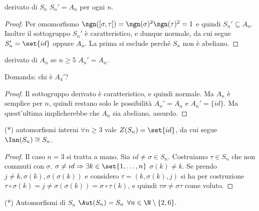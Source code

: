 \begin{proposition}{derivato di $S_n$}
    $S_n' = A_n$ per ogni $n$.    
\end{proposition}
\begin{proof}
    Per omomorfismo $\sgn([\sigma, \tau]) = \sgn(\sigma)^2\sgn(\tau)^2 = 1$ e quindi $S_n' \subseteq A_n$. \\ Inoltre il sottogruppo $S_n'$ è caratteristico, e dunque normale, da cui segue $S_n' = \set{id}$ oppure $A_n$. La prima si esclude perché $S_n$ non è abeliano. 
\end{proof}
\begin{proposition}{derivato di $A_n$}
    se $n \geq 5$ $A_n' = A_n$.
    
    Domanda: chi è $A_4'$?
\end{proposition}
\begin{proof}
    Il sottogruppo derivato è caratteristico, e quindi normale. Ma $A_n$ è semplice per $n $, quindi restano solo le possibilità $A_n' = A_n$ e $A_n' = \{ id\}$. Ma quest'ultima implicherebbe che $A_n$ sia abeliano, assurdo. 
\end{proof}
\hypertarget{InnSn}{\begin{proposition}{(*) automorfismi interni}
    $\forall n\geq3$ vale $Z(S_n) = \set{id}$, da cui segue $\Inn(S_n) \cong S_n$. 
\end{proposition}}
\begin{proof}
    Il caso $n = 3$ si tratta a mano. Sia $id \neq \sigma \in S_n$. Costruiamo $\tau \in S_n$ che non commuti con $\sigma$. $\sigma \neq id \Rightarrow \exists k \in \set{1, \dots, n}$ $\sigma(k) \neq k$. Se prendo $j \neq k,\sigma(k),\sigma(\sigma(k))$ e considero $\tau = (k, \sigma(k), j)$ si ha per costruzione $\tau\circ\sigma(k) = j \neq \sigma(\sigma(k)) = \sigma\circ\tau(k)$, e quindi $\tau\sigma \neq \sigma\tau $ come voluto.
\end{proof}
\begin{proposition}{(*) Automorfismi di $S_n$}
    $\Aut(S_n) = S_n$ $\forall n \in \N \setminus \{2, 6\}.$
\end{proposition}
